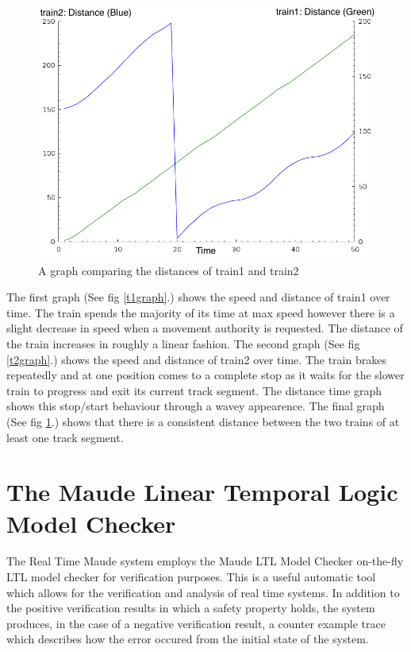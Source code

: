 \begin{figure}
\label{t1t2graph}
\begin{center}
\includegraphics[scale=0.5]{t1t2graph.png}
\end{center}
\caption{A graph comparing the distances of train1 and train2}
\end{figure}

The first graph (See fig \ref{t1graph}.) shows the speed and distance of train1 over time. The train spends the majority of its time at max speed however there is a slight decrease in speed when a movement authority is requested. The distance of the train increases in roughly a linear fashion. The second graph (See fig \ref{t2graph}.) shows the speed and distance of train2 over time. The train brakes repeatedly and at one position comes to a complete stop as it waits for the slower train to progress and exit its current track segment. The distance time graph shows this stop/start behaviour through a wavey appearence. The final graph (See fig \ref{t1t2graph}.) shows that there is a consistent distance between the two trains of at least one track segment.


\section{The Maude Linear Temporal Logic Model Checker}
The Real Time Maude system employs the Maude LTL Model Checker on-the-fly LTL model checker for \cite{ES00} verification purposes.  This is a useful automatic tool which allows for the verification and analysis of real time systems. In addition to the positive verification results in which a safety property holds,  the system produces, in the case of a negative verification result, a counter example trace which describes how the error occured from the initial state of the system.

